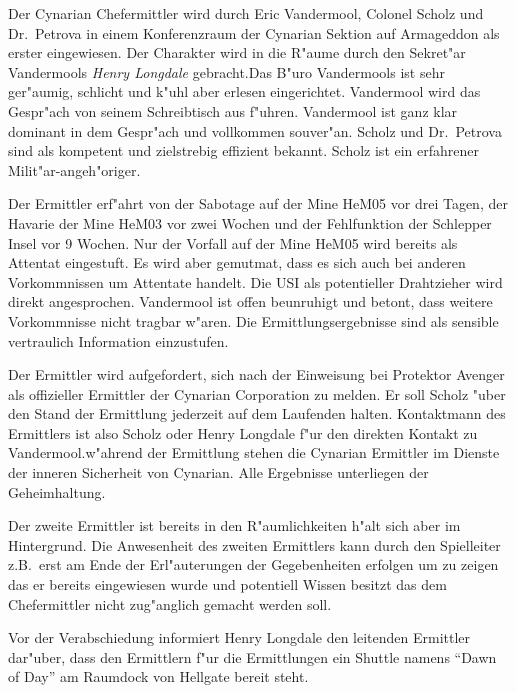 
Der Cynarian Chefermittler wird durch Eric Vandermool, Colonel Scholz und Dr.~Petrova in einem Konferenzraum der Cynarian Sektion auf Armageddon als erster eingewiesen. Der Charakter wird in die R"aume durch den Sekret"ar Vandermools \emph{Henry Longdale} gebracht.Das B"uro Vandermools ist sehr ger"aumig, schlicht und k"uhl aber erlesen eingerichtet. Vandermool wird das Gespr"ach von seinem Schreibtisch aus f"uhren. Vandermool ist ganz klar dominant in dem Gespr"ach und vollkommen souver"an. Scholz und Dr.~Petrova sind als kompetent und zielstrebig effizient bekannt. Scholz ist ein erfahrener Milit"ar-angeh"origer.

Der Ermittler erf"ahrt von der Sabotage auf der Mine HeM05 vor drei Tagen, der Havarie der Mine HeM03 vor zwei Wochen und der Fehlfunktion der Schlepper Insel vor 9 Wochen. Nur der Vorfall auf der Mine HeM05 wird bereits als Attentat eingestuft. Es wird aber gemutma\3t, dass es sich auch bei anderen Vorkommnissen um Attentate handelt. Die USI als potentieller Drahtzieher wird direkt angesprochen. Vandermool ist offen beunruhigt und betont, dass weitere Vorkommnisse nicht tragbar w"aren. Die Ermittlungsergebnisse sind als sensible vertraulich Information einzustufen. 

Der Ermittler wird aufgefordert, sich nach der Einweisung bei Protektor Avenger als offizieller Ermittler der Cynarian Corporation zu melden. Er soll Scholz "uber den Stand der Ermittlung jederzeit auf dem Laufenden halten. Kontaktmann des Ermittlers ist also Scholz oder Henry Longdale f"ur den direkten Kontakt zu Vandermool.w"ahrend der Ermittlung stehen die Cynarian Ermittler im Dienste der inneren Sicherheit von Cynarian. Alle Ergebnisse unterliegen der Geheimhaltung.

Der zweite Ermittler ist bereits in den R"aumlichkeiten h"alt sich aber im Hintergrund. Die Anwesenheit des zweiten Ermittlers kann durch den Spielleiter z.B.~erst am Ende der Erl"auterungen der Gegebenheiten erfolgen um zu zeigen das er bereits eingewiesen wurde und potentiell Wissen besitzt das dem Chefermittler nicht zug"anglich gemacht werden soll.

Vor der Verabschiedung informiert Henry Longdale den leitenden Ermittler dar"uber, dass den Ermittlern f"ur die Ermittlungen ein Shuttle namens "`Dawn of Day"' am Raumdock von Hellgate bereit steht.


